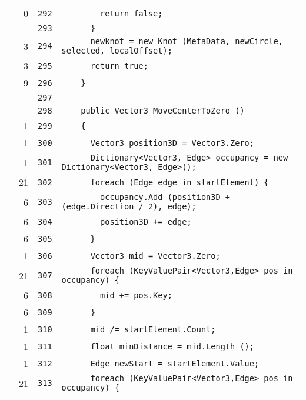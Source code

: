\documentclass[a4paper,10pt]{article}
\begin{document}
\begin{longtable}[l]{lrrl}
\cellcolor{red} & 0 & \verb~292~ & \verb~        return false;~\\
\cellcolor{gray} &  & \verb~293~ & \verb~      }~\\
\cellcolor{green} & 3 & \verb~294~ & \verb~      newknot = new Knot (MetaData, newCircle, selected, localOffset);~\\
\cellcolor{green} & 3 & \verb~295~ & \verb~      return true;~\\
\cellcolor{green} & 9 & \verb~296~ & \verb~    }~\\
\cellcolor{gray} &  & \verb~297~ & \verb~~\\
\cellcolor{gray} &  & \verb~298~ & \verb~    public Vector3 MoveCenterToZero ()~\\
\cellcolor{green} & 1 & \verb~299~ & \verb~    {~\\
\cellcolor{green} & 1 & \verb~300~ & \verb~      Vector3 position3D = Vector3.Zero;~\\
\cellcolor{green} & 1 & \verb~301~ & \verb~      Dictionary<Vector3, Edge> occupancy = new Dictionary<Vector3, Edge>();~\\
\cellcolor{green} & 21 & \verb~302~ & \verb~      foreach (Edge edge in startElement) {~\\
\cellcolor{green} & 6 & \verb~303~ & \verb~        occupancy.Add (position3D + (edge.Direction / 2), edge);~\\
\cellcolor{green} & 6 & \verb~304~ & \verb~        position3D += edge;~\\
\cellcolor{green} & 6 & \verb~305~ & \verb~      }~\\
\cellcolor{green} & 1 & \verb~306~ & \verb~      Vector3 mid = Vector3.Zero;~\\
\cellcolor{green} & 21 & \verb~307~ & \verb~      foreach (KeyValuePair<Vector3,Edge> pos in occupancy) {~\\
\cellcolor{green} & 6 & \verb~308~ & \verb~        mid += pos.Key;~\\
\cellcolor{green} & 6 & \verb~309~ & \verb~      }~\\
\cellcolor{green} & 1 & \verb~310~ & \verb~      mid /= startElement.Count;~\\
\cellcolor{green} & 1 & \verb~311~ & \verb~      float minDistance = mid.Length ();~\\
\cellcolor{green} & 1 & \verb~312~ & \verb~      Edge newStart = startElement.Value;~\\
\cellcolor{green} & 21 & \verb~313~ & \verb~      foreach (KeyValuePair<Vector3,Edge> pos in occupancy) {~\\

\end{longtable}
\end{document}
